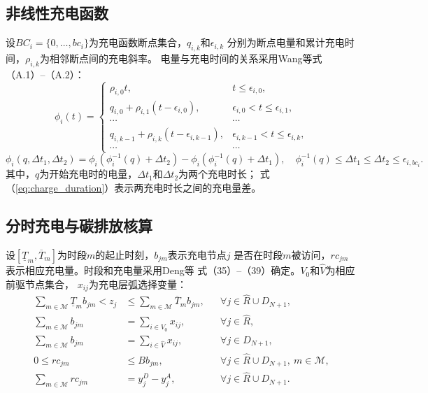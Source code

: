 \subsection{非线性充电函数}
\label{sec:charging-model}

设$BC_i=\{0,\ldots,bc_i\}$为充电函数断点集合，$q_{i,k}$和$\epsilon_{i,k}$
分别为断点电量和累计充电时间，$\rho_{i,k}$为相邻断点间的充电斜率。
电量与充电时间的关系采用Wang等\cite{ref:94}式（A.1）--（A.2）：
\begin{equation}
\phi_i(t)=
\begin{cases}
\rho_{i,0}t, & t\le\epsilon_{i,0},\\
q_{i,0}+\rho_{i,1}(t-\epsilon_{i,0}), & \epsilon_{i,0}<t\le\epsilon_{i,1},\\
\cdots & \cdots\\
q_{i,k-1}+\rho_{i,k}(t-\epsilon_{i,k-1}),
& \epsilon_{i,k-1}<t\le\epsilon_{i,k},\\
\cdots & \cdots
\end{cases}
\label{eq:wang-charge-function}
\end{equation}
\begin{equation}
\phi_i(q,\Delta t_1,\Delta t_2)
=\phi_i\!\left(\phi_i^{-1}(q)+\Delta t_2\right)
-\phi_i\!\left(\phi_i^{-1}(q)+\Delta t_1\right),
\quad
\phi_i^{-1}(q)\le\Delta t_1\le\Delta t_2\le\epsilon_{i,bc_i}.
\label{eq:charge_duration}
\end{equation}
其中，$q$为开始充电时的电量，$\Delta t_1$和$\Delta t_2$为两个充电时长；
式（\ref{eq:charge_duration}）表示两充电时长之间的充电量差。

\subsection{分时充电与碳排放核算}
\label{sec:time-carbon-model}

设$[\underline T_m,\overline T_m]$为时段$m$的起止时刻，$b_{jm}$表示充电节点$j$
是否在时段$m$被访问，$rc_{jm}$表示相应充电量。时段和充电量采用Deng等\cite{ref:96}
式（35）--（39）确定。$V_0$和$\widehat V$为相应前驱节点集合，
$x_{ij}$为充电层弧选择变量：
\begin{align}
\sum_{m\in \mathcal M}\underline T_m b_{jm}<z_j
&\le\sum_{m\in \mathcal M}\overline T_m b_{jm},
&&\forall j\in \widehat R\cup D_{N+1},
\label{eq:deng-35}\\
\sum_{m\in \mathcal M}b_{jm}&=\sum_{i\in V_0}x_{ij},
&&\forall j\in\widehat R,
\label{eq:deng-36}\\
\sum_{m\in \mathcal M}b_{jm}&=\sum_{i\in\widehat V}x_{ij},
&&\forall j\in D_{N+1},
\label{eq:deng-37}\\
0\le rc_{jm}&\le B b_{jm},
&&\forall j\in\widehat R\cup D_{N+1},\ m\in \mathcal M,
\label{eq:deng-38}\\
\sum_{m\in \mathcal M}rc_{jm}&=y_j^D-y_j^A,
&&\forall j\in\widehat R\cup D_{N+1}.
\label{eq:deng-39}
\end{align}

